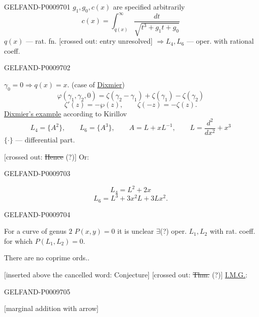 \begin{GelfandAdjacentEvidence}{GELFAND-P000970}{1}
$g_1,g_0,c(x)$ are specified arbitrarily
\begin{equation*}
 c(x)=\int_{q(x)}^{\infty}\frac{dt}{\sqrt{t^3+g_1t+g_0}}\tag{4}
\end{equation*}
$q(x)$ --- rat. fn. [crossed out: entry unresolved]
$\Rightarrow L_4,L_6$ --- oper. with rational coeff.
\end{GelfandAdjacentEvidence}
\begin{GelfandAdjacentEvidence}{GELFAND-P000970}{2}


$\gamma_0=0\Rightarrow q(x)=x$. (case of \underline{Dixmier})
\[
 \varphi(\gamma_1,\gamma_2,0)=\zeta(\gamma_2-\gamma_1)+\zeta(\gamma_1)-\zeta(\gamma_2)
\]
\[
 \zeta'(z)=-\wp(z),\qquad \zeta(-z)=-\zeta(z).
\]
\underline{Dixmier’s example} according to Kirillov
\[
 L_4=\{A^2\},\qquad L_6=\{A^3\},\qquad A=L+xL^{-1},\qquad
 L=\frac{d^2}{dx^2}+x^3
\]
$\{\cdot\}$ --- differential part.

[crossed out: \sout{Hence} (?)] Or:
\end{GelfandAdjacentEvidence}
\begin{GelfandAdjacentEvidence}{GELFAND-P000970}{3}

\[
 L_4=L^2+2x
\]
\[
 L_6=L^3+3x^2L+3Lx^2.
\]
\end{GelfandAdjacentEvidence}
\begin{GelfandAdjacentEvidence}{GELFAND-P000970}{4}


For a curve of genus $2$ $P(x,y)=0$ it is unclear $\exists$(?) oper.
$L_1,L_2$ with rat. coeff. for which $P(L_1,L_2)=0$.

There are no coprime ords..

[inserted above the cancelled word: Conjecture] [crossed out: \sout{Thm.} (?)]
\underline{I.M.G.}: 
\end{GelfandAdjacentEvidence}
\begin{GelfandAdjacentEvidence}{GELFAND-P000970}{5}


[marginal addition with arrow] 
\end{GelfandAdjacentEvidence}

